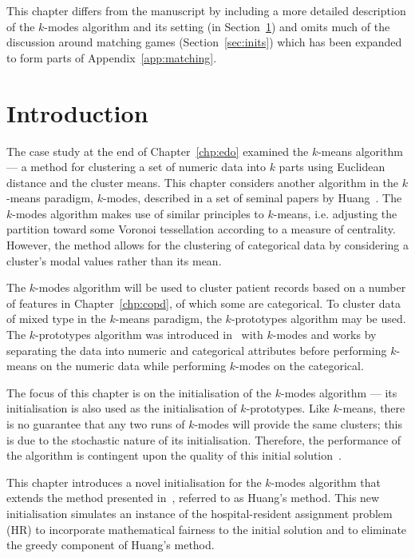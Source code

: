 \myrule%

This chapter differs from the manuscript by including a more detailed
description of the \(k\)-modes algorithm and its setting (in
Section~\ref{sec:kmodes:intro}) and omits much of the discussion around matching
games (Section~\ref{sec:inits}) which has been expanded to form parts of
Appendix~\ref{app:matching}.

\section{Introduction}\label{sec:kmodes:intro}

The case study at the end of Chapter~\ref{chp:edo} examined the \(k\)-means
algorithm --- a method for clustering a set of numeric data into \(k\) parts
using Euclidean distance and the cluster means. This chapter considers another
algorithm in the \(k\)-means paradigm, \(k\)-modes, described in a set of
seminal papers by Huang~\cite{Huang1997a, Huang1997b, Huang1998}. The
\(k\)-modes algorithm makes use of similar principles to \(k\)-means, i.e.
adjusting the partition toward some Voronoi tessellation according to a measure
of centrality. However, the method allows for the clustering of categorical data
by considering a cluster's modal values rather than its mean.

The \(k\)-modes algorithm will be used to cluster patient records based on a
number of features in Chapter~\ref{chp:copd}, of which some are categorical. To
cluster data of mixed type in the \(k\)-means paradigm, the \(k\)-prototypes
algorithm may be used. The \(k\)-prototypes algorithm was introduced
in~\cite{Huang1998} with \(k\)-modes and works by separating the data into
numeric and categorical attributes before performing \(k\)-means on the numeric
data while performing \(k\)-modes on the categorical.

The focus of this chapter is on the initialisation of the \(k\)-modes algorithm
--- its initialisation is also used as the initialisation of \(k\)-prototypes.
Like \(k\)-means, there is no guarantee that any two runs of \(k\)-modes will
provide the same clusters; this is due to the stochastic nature of its
initialisation. Therefore, the performance of the algorithm is contingent upon
the quality of this initial solution~\cite{Huang1998}.

This chapter introduces a novel initialisation for the \(k\)-modes algorithm
that extends the method presented in~\cite{Huang1998}, referred to as Huang's
method. This new initialisation simulates an instance of the hospital-resident
assignment problem (HR) to incorporate mathematical fairness to the initial
solution and to eliminate the greedy component of Huang's method.

